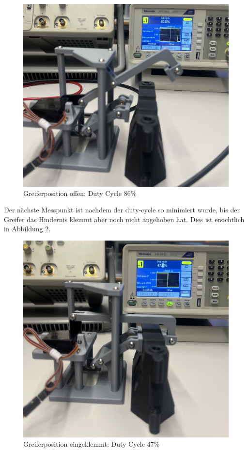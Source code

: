 \begin{figure}[H]
    \centering
    \includegraphics[width=0.8\linewidth]{img/ServoGreifferoffen.jpeg}
    \caption{Greiferposition offen: Duty Cycle 86\%}
    \label{fig: Greiferposition offen: Duty Cycle 86}
\end{figure}

\newpage

Der nächste Messpunkt ist nachdem der \gls{duty-cycle} so minimiert wurde, bis der Greifer das Hindernis klemmt aber noch nicht angehoben hat. Dies ist ersichtlich in Abbildung \ref{fig: Greiferposition eingeklemmt: Duty Cycle 47}.

\begin{figure}[H]
    \centering
    \includegraphics[width=0.8\linewidth]{img/ServoGreiferKlemmt.jpeg}
    \caption{Greiferposition eingeklemmt: Duty Cycle 47\%}
    \label{fig: Greiferposition eingeklemmt: Duty Cycle 47}
\end{figure}

